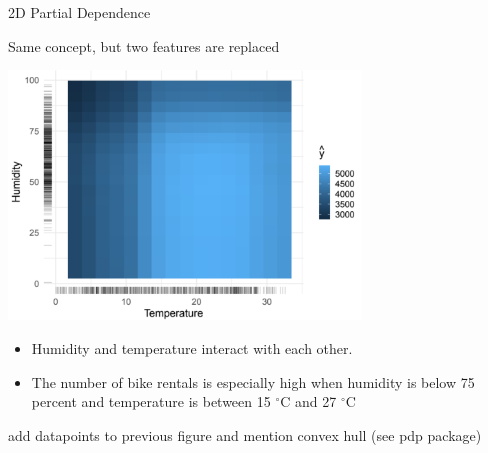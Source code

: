 \documentclass[11pt,compress,t,notes=noshow, xcolor=table]{beamer}
\begin{document}


\begin{vbframe}{2D Partial Dependence}

Same concept, but two features are replaced

\framebreak

\begin{center}
\includegraphics[width=0.7\textwidth]{figure_man/bike-sharing-dataset02.png}
\end{center}

\begin{itemize}
 \item Humidity and temperature interact with each other.
 \item The number of bike rentals is especially high when humidity is below 75 percent and temperature is between 15 $^{\circ}$C and 27 $^{\circ}$C
\end{itemize}


\framebreak

add datapoints to previous figure and mention convex hull (see pdp package)

\end{vbframe}

\endlecture
\end{document}
